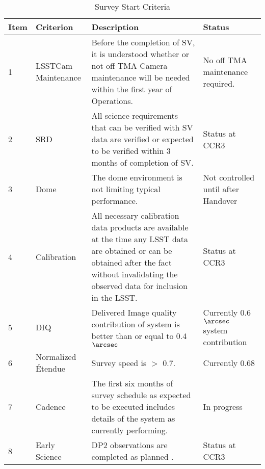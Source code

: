 \begin{table}[]
\renewcommand{\arraystretch}{2}
\small
\centering
\caption{Survey Start Criteria}\label{tab:criteria}
\begin{tabular}{|p{0.25in}|p{1in}|p{4in}|p{1.0in}|}
\hline
Item & Criterion & Description& Status \\
\hline \hline

1 & \makecell[l]{LSSTCam\\ Maintenance} & Before the completion of SV, it is understood whether or not off TMA Camera maintenance will be needed within the first year of Operations.& No off TMA maintenance required.  \\\hline  

2 & SRD &All science requirements that can be verified with SV data are verified or expected to be verified within 3 months of completion of SV. & Status at CCR3 \\\hline

3 & Dome & The dome environment is not limiting typical performance. &\makecell[l]{ Not controlled \\until after \\Handover} \\\hline

4 & Calibration & All necessary calibration data products are available at the time any LSST data are obtained or can be obtained after the fact without invalidating the observed data for inclusion in the LSST. & Status at CCR3 \\\hline

5& DIQ& Delivered Image quality contribution of system is better than or equal to 0.4$\arcsec$ & \makecell[l]{Currently 0.6$\arcsec$ \\system \\contribution}\\\hline

6 & Normalized \'{E}tendue & Survey speed  is $>$ 0.7. & Currently 0.68 \\\hline

7 & Cadence & The first six months of survey schedule as expected to be executed includes details of the system as currently performing.& In progress\\\hline

8 & Early Science&DP2 observations are completed as planned \citep{RTN-011}.& Status at CCR3 \\

\hline
\end{tabular}
\end{table}

